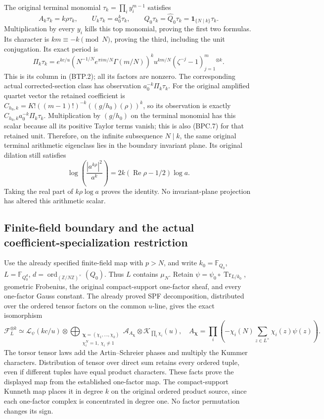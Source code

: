 The original terminal monomial \(\tau_k=\prod_i y_i^{m-1}\)
satisfies
\[
 A_k\tau_k=k\rho\tau_k,\qquad
 U_k\tau_k=a_0^k\tau_k,\qquad
 Q_0\tau_k=\widehat Q_0\tau_k
   =\mathbf1_{\{N\mid k\}}\tau_k .
\tag{BTP.9}\label{eq:btp9}
\]
Multiplication by every \(y_i\) kills this top monomial,
proving the first two formulas.  Its character is
\(km\equiv-k\pmod N\), proving the third, including
the unit conjugation.  Its exact period is
\[
 \Pi_k\tau_k=e^{kc/u}
   \left(N^{-1/N}e^{\pi im/N}\Gamma(m/N)\right)^k
        u^{km/N}(\zeta^{-j}-1)_{j=1}^{m}{}^{\otimes k}.
\tag{BTP.10}\label{eq:btp10}
\]
This is its column in (BTP.2); all its factors are
nonzero.  The corresponding actual corrected-section
class has observation \(a_0^{-k}\Pi_k\tau_k\).
For the original amplified quartet vector the retained
coefficient is
\(C_{h_0,k}=K!((m-1)!)^{-k}((g/h_0)(\rho))^k\), so
its observation is exactly
\(C_{h_0,k}a_0^{-k}\Pi_k\tau_k\).  Multiplication by
\((g/h_0)\) on the terminal monomial has this scalar
because all its positive Taylor terms vanish; this is
also (BPC.7) for that retained unit.  Therefore, on the
infinite subsequence \(N\mid k\), the same original
terminal arithmetic eigenclass lies in the boundary
invariant plane.  Its original dilation still satisfies
\[
 \log\left(\frac{|a^{k\rho}|^2}{a^k}\right)
        =2k(\operatorname{Re}\rho-1/2)\log a.
\tag{BTP.11}\label{eq:btp11}
\]
Taking the real part of \(k\rho\log a\) proves the
identity.  No invariant-plane projection has altered
this arithmetic scalar.

\subsection{Finite-field boundary and the actual coefficient-specialization restriction}
\label{sec:btp-finite-field-update}

Use the already specified finite-field map with
\(p>N\), and write \(k_0=\mathbb F_{Q_0}\),
\(L=\mathbb F_{Q_0^d}\),
\(d=\operatorname{ord}_{(\mathbb Z/N\mathbb Z)^\times}(Q_0)\).
Thus \(L\) contains \(\mu_N\).  Retain
\(\psi=\psi_0\circ\operatorname{Tr}_{L/k_0}\),
geometric Frobenius, the original compact-support
one-factor sheaf, and every one-factor Gauss constant.
The already proved SPF decomposition, distributed over
the ordered tensor factors on the common \(u\)-line,
gives the exact isomorphism
\[
 \mathcal F_L^{\otimes k}
   \simeq \mathcal L_\psi(kc/u)\otimes
   \bigoplus_{\substack{\boldsymbol\chi=(\chi_1,\ldots,\chi_k)\\
                       \chi_i^N=1,\ \chi_i\ne1}}
       \mathcal A_{A_{\boldsymbol\chi}}
               \otimes\mathcal K_{\prod_i\chi_i}(u),
 \quad
 A_{\boldsymbol\chi}
    =\prod_i\left(-\chi_i(N)
          \sum_{z\in L^\times}\chi_i(z)\psi(z)\right).
\tag{BTF.1}\label{eq:btf1}
\]
The torsor tensor laws add the Artin--Schreier phases
and multiply the Kummer characters.  Distribution of
tensor over direct sum retains every ordered tuple,
even if different tuples have equal product characters.
These facts prove the displayed map from the established
one-factor map.  The compact-support Kunneth map places
it in degree \(k\) on the original ordered product
source, since each one-factor complex is concentrated
in degree one.  No factor permutation changes its sign.

